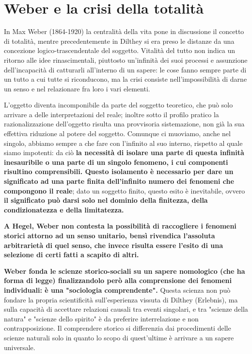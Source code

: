 \section{Weber e la crisi della totalità}

In Max Weber (1864-1920) la centralità della vita pone in discussione il concetto di totalità, mentre precedentemente in Dilthey si era preso le distanze da una concezione logico-trascendentale del soggetto. Vitalità del tutto non indica un ritorno alle idee rinascimentali, piuttosto un'infinità dei suoi processi e assunzione dell'incapacità di catturarli all'interno di un sapere: le cose fanno sempre  parte di un tutto a cui tutte si riconducono, ma la crisi consiste nell'impossibilità di darne un senso e nel relazionare fra loro i vari elementi.

L'oggetto diventa incomponibile da parte del soggetto teoretico, che può solo arrivare a delle interpretazioni del reale; inoltre sotto il profilo pratico la razionalizzazione dell'oggetto risulta una provvisoria sistemazione, non già la sua effettiva riduzione al potere del soggetto. Comunque ci muoviamo, anche nel singolo, abbiamo sempre a che fare con l'infinito al suo interno, rispetto al quale siamo impotenti: da ciò \textbf{la necessità di isolare una parte di questa infinità inesauribile o una parte di un singolo fenomeno, i cui componenti risultino comprensibili. Questo isolamento è necessario per dare un significato ad una parte finita dell'infinito numero dei fenomeni che compongono il reale}; dato un soggetto finito, questo esito è inevitabile, ovvero \textbf{il significato può darsi solo nel dominio della finitezza, della condizionatezza e della limitatezza.}

\textbf{A Hegel, Weber non contesta la possibilità di raccogliere i fenomeni storici attorno ad un senso unitario, bensì rivendica l'assoluta arbitrarietà di quel senso, che invece risulta essere l'esito di una selezione di certi fatti a scapito di altri.}

\textbf{Weber fonda le scienze storico-sociali su un sapere nomologico (che ha forma di legge) finalizzandolo  però alla comprensione dei fenomeni individuali: è una "sociologia comprendente".} Questa scienza non può fondare la propria scientificità sull'esperienza vissuta di Dilthey (Erlebnis), ma sulla capacità di accettare relazioni causali tra eventi singolari, e tra "scienze della natura" e "scienze dello spirito" è da preferire interrelazione e non contrapposizione. Il comprendere storico si differenzia dai procedimenti delle scienze naturali solo in quanto lo scopo di quest'ultime è arrivare a un sapere universale.

